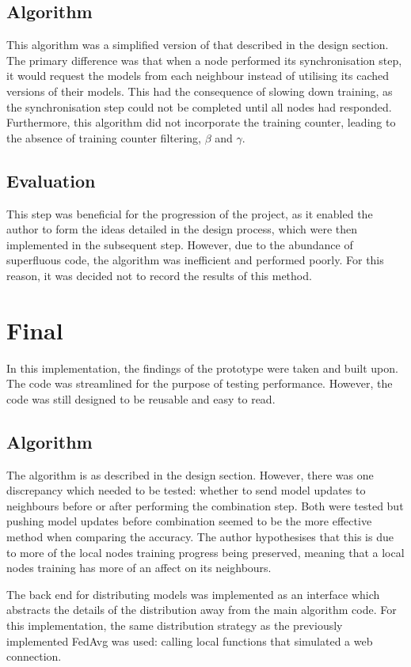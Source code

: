 \subsection{Algorithm} \label{reasonforcache}
This algorithm was a simplified version of that described in the design section. The primary difference was that when a node performed its synchronisation step, it would request the models from each neighbour instead of utilising its cached versions of their models. This had the consequence of slowing down training, as the synchronisation step could not be completed until all nodes had responded. Furthermore, this algorithm did not incorporate the training counter, leading to the absence of training counter filtering, $\beta$ and $\gamma$.

\subsection{Evaluation}
This step was beneficial for the progression of the project, as it enabled the author to form the ideas detailed in the design process, which were then implemented in the subsequent step. However, due to the abundance of superfluous code, the algorithm was inefficient and performed poorly. For this reason, it was decided not to record the results of this method.

\section{Final}
In this implementation, the findings of the prototype were taken and built upon. The code was streamlined for the purpose of testing performance. However, the code was still designed to be reusable and easy to read.

\subsection{Algorithm}
The algorithm is as described in the design section. However, there was one discrepancy which needed to be tested: whether to send model updates to neighbours before or after performing the combination step. Both were tested but pushing model updates before combination seemed to be the more effective method when comparing the accuracy. The author hypothesises that this is due to more of the local nodes training progress being preserved, meaning that a local nodes training has more of an affect on its neighbours.

The back end for distributing models was implemented as an interface which abstracts the details of the distribution away from the main algorithm code. For this implementation, the same distribution strategy as the previously implemented FedAvg was used: calling local functions that simulated a web connection.

